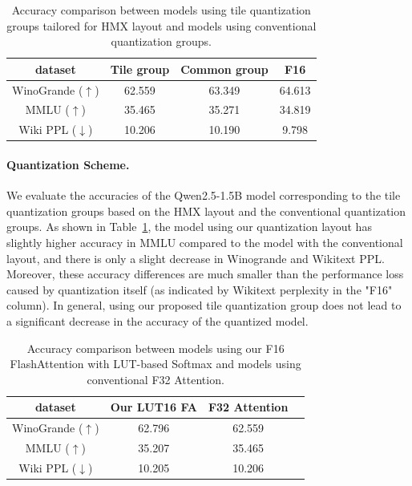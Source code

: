 \begin{table}[h]
    \centering
    \begin{tabular}{cccc}
        \hline
        dataset & Tile group & Common group & F16 \\
        \hline
        WinoGrande ($\uparrow$) & 62.559 & 63.349 & 64.613 \\
        MMLU ($\uparrow$) & 35.465 & 35.271 & 34.819 \\
        Wiki PPL ($\downarrow$) & 10.206 & 10.190 & 9.798 \\
        \hline
    \end{tabular}
    \caption{Accuracy comparison between models using tile quantization groups tailored for HMX layout and models using conventional quantization groups.}
    \label{tab:quantization-group-accuracy-compare}
    \vspace{-1em}
\end{table}

\paragraph{Quantization Scheme.} We evaluate the accuracies of the Qwen2.5-1.5B model corresponding to the tile quantization groups based on the HMX layout and the conventional quantization groups. As shown in Table~\ref{tab:quantization-group-accuracy-compare}, the model using our quantization layout has slightly higher accuracy in MMLU compared to the model with the conventional layout, and there is only a slight decrease in Winogrande and Wikitext PPL. Moreover, these accuracy differences are much smaller than the performance loss caused by quantization itself (as indicated by Wikitext perplexity in the "F16" column). In general, using our proposed tile quantization group does not lead to a significant decrease in the accuracy of the quantized model.

\begin{table}[h]
    \centering
    \begin{tabular}{cccc}
        \hline
        dataset & Our LUT16 FA & F32 Attention  \\
        \hline
        WinoGrande ($\uparrow$) & 62.796 & 62.559 \\
        MMLU ($\uparrow$) & 35.207 & 35.465 \\
        Wiki PPL ($\downarrow$) & 10.205 & 10.206 \\
        \hline
    \end{tabular}
    \caption{Accuracy comparison between models using our F16 FlashAttention with LUT-based Softmax and models using conventional F32 Attention.}
    \label{tab:fa-method-accuracy-compare}
    \vspace{-1em}
\end{table}

